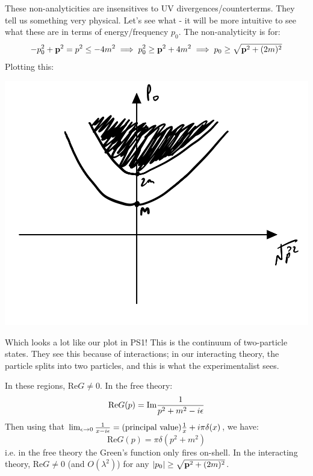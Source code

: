 These non-analyticities are insensitives to UV divergences/counterterms. They tell us something very physical. Let's see what - it will be more intuitive to see what these are in terms of energy/frequency $p_0$. The non-analyticity is for:
\begin{equation}
    -p_0^2 + \mathbf{p}^2 = p^2 \leq -4m^2 \implies p_0^2 \geq \mathbf{p}^2 + 4m^2 \implies p_0 \geq \sqrt{\mathbf{p}^2 + (2m)^2}
\end{equation}
Plotting this:

\begin{center}
    \includegraphics[scale=0.4]{Lectures/Figures/lec13-dispersion.png}
\end{center}

Which looks a lot like our plot in PS1! This is the continuum of two-particle states. They see this because of interactions; in our interacting theory, the particle splits into two particles, and this is what the experimentalist sees.

In these regions, $\text{Re}G \neq 0$. In the free theory:
\begin{equation}
    \text{Re}G(p) = \text{Im}\frac{1}{p^2 + m^2 - i\epsilon}
\end{equation}
Then using that $\lim_{\epsilon\to 0}\frac{1}{x - i\epsilon} = \text{(principal value)}\frac{1}{x} + i\pi\delta(x)$, we have:
\begin{equation}
    \text{Re}G(p) = \pi\delta(p^2 + m^2)
\end{equation}
i.e. in the free theory the Green's function only fires on-shell. In the interacting theory, $\text{Re} G \neq 0$ (and $O(\lambda^2)$) for any $\lvert p_0 \rvert \geq \sqrt{\mathbf{p}^2 + (2m)^2}$.

